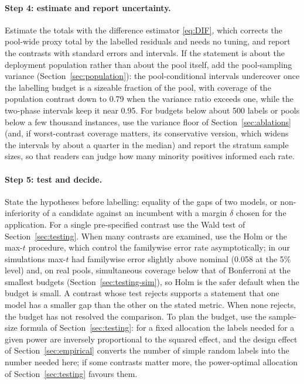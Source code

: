\documentclass[pdflatex,sn-mathphys-num,iicol]{sn-jnl}
\theoremstyle{thmstyleone}
\theoremstyle{thmstyletwo}
\theoremstyle{thmstylethree}
\begin{document}
\paragraph{Step 4: estimate and report uncertainty.} Estimate the totals with the difference estimator \eqref{eq:DIF}, which corrects the pool-wide proxy total by the labelled residuals and needs no tuning, and report the contrasts with standard errors and intervals. If the statement is about the deployment population rather than about the pool itself, add the pool-sampling variance (Section~\ref{sec:population}): the pool-conditional intervals undercover once the labelling budget is a sizeable fraction of the pool, with coverage of the population contrast down to 0.79 when the variance ratio exceeds one, while the two-phase intervals keep it near 0.95. For budgets below about 500 labels or pools below a few thousand instances, use the variance floor of Section~\ref{sec:ablations} (and, if worst-contrast coverage matters, its conservative version, which widens the intervals by about a quarter in the median) and report the stratum sample sizes, so that readers can judge how many minority positives informed each rate.

\paragraph{Step 5: test and decide.} State the hypotheses before labelling: equality of the gaps of two models, or non-inferiority of a candidate against an incumbent with a margin $\delta$ chosen for the application. For a single pre-specified contrast use the Wald test of Section~\ref{sec:testing}. When many contrasts are examined, use the Holm or the max-$t$ procedure, which control the familywise error rate asymptotically; in our simulations max-$t$ had familywise error slightly above nominal (0.058 at the 5\% level) and, on real pools, simultaneous coverage below that of Bonferroni at the smallest budgets (Section~\ref{sec:testing-sim}), so Holm is the safer default when the budget is small. A contrast whose test rejects supports a statement that one model has a smaller gap than the other on the stated metric. When none rejects, the budget has not resolved the comparison. To plan the budget, use the sample-size formula of Section~\ref{sec:testing}: for a fixed allocation the labels needed for a given power are inversely proportional to the squared effect, and the design effect of Section~\ref{sec:empirical} converts the number of simple random labels into the number needed here; if some contrasts matter more, the power-optimal allocation of Section~\ref{sec:testing} favours them.
\end{document}
